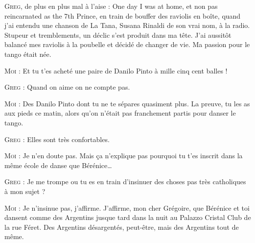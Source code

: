 \begin{dialogue}

\textsc{Greg}, de plus en plus mal à l’aise : One day I was at home, et non pas reincarnated as the 7th Prince, en train de bouffer des raviolis en boîte, quand j’ai entendu une chanson de La Tana, Susana Rinaldi de son vrai nom, à la radio. Stupeur et tremblements, un déclic s’est produit dans ma tête. J’ai aussitôt balancé mes raviolis à la poubelle et décidé de changer de vie. Ma passion pour le tango était née.

\textsc{Moi} : Et tu t’es acheté une paire de Danilo Pinto à mille cinq cent balles !

\textsc{Greg} : Quand on aime on ne compte pas.

\textsc{Moi} : Des Danilo Pinto dont tu ne te sépares quasiment plus. La preuve, tu les as aux pieds ce matin, alors qu’on n’était pas franchement partis pour danser le tango.

\textsc{Greg} : Elles sont très confortables.

\textsc{Moi} : Je n’en doute pas. Mais ça n’explique pas pourquoi tu t’es inscrit dans la même école de danse que Bérénice…

\textsc{Greg} : Je me trompe ou tu es en train d’insinuer des choses pas très catholiques à mon sujet ?

\textsc{Moi} : Je n’insinue pas, j’affirme. J’affirme, mon cher Grégoire, que Bérénice et toi dansent comme des Argentins jusque tard dans la nuit au Palazzo Cristal Club de la rue Féret. Des Argentins désargentés, peut-être, mais des Argentins tout de même.


\end{dialogue}
